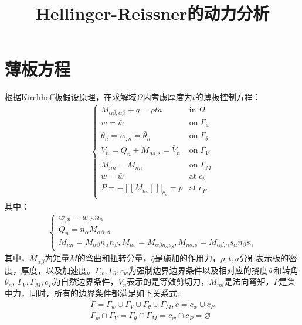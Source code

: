 \documentclass[11pt,a4paper]{article}
\begin{document}
\title{Hellinger-Reissner的动力分析}
\date{}
\maketitle
\section{薄板方程}
根据Kirchhoff板假设原理，在求解域$\Omega$内考虑厚度为$t$的薄板控制方程：
    \begin{equation}
        \begin{split}
        \begin{cases}
        M_{\alpha\beta,\alpha\beta}+\bar q=\rho t a&\text {in} \; \Omega\\
        w=\bar w&\text{on}\;\Gamma_w\\
        \theta_n=w_{,n}=\bar \theta_n&\text{on}\;\Gamma_{\theta}\\
        V_n=Q_n+M_{ns,s}=\bar V_n&\text {on}\;\Gamma_V\\
        M_{nn}=\bar M_{nn}&\text {on}\; \Gamma_M\\
        w=\bar w&\text {at} \; c_w\\
        P=-[[M_{ns}]]\vert_{c_p}=\bar p&\text {at}\; c_P
        \end{cases}
        \end{split}
    \end{equation}
其中：
\begin{equation}
\begin{split}
    \begin{cases}
    w_{,n}=w_{,\alpha}n_{\alpha}\\
Q_n=n_{\alpha}M_{\alpha\beta,\beta}\\
M_{nn}=M_{\alpha\beta}n_{\alpha}n_{\beta},M_{ns}=M_{\alpha\beta n_{\alpha}s_{\beta}},M_{ns,s}=M_{\alpha\beta,\gamma}s_{\alpha}n_{\beta}s_{\gamma}
    \end{cases}
\end{split}
\end{equation}
其中，$M_{\alpha\beta}$为矩量$M$的弯曲和扭转分量，$\bar q$是施加的作用力，$\rho,t,a$分别表示板的密度，厚度，以及加速度。$\Gamma_w,\Gamma_{\theta},c_w$为强制边界边界条件以及相对应的挠度$\bar w$和转角$\bar \theta_n$,
$\Gamma_V,\Gamma_M,c_P$为自然边界条件，$V_n$表示的是等效剪切力，$M_{nn}$是法向弯矩，$P$是集中力，同时，所有的边界条件都满足如下关系式:
\begin{equation}
    \begin{split}
    \Gamma=\Gamma_w\cup\Gamma_V\cup\Gamma_{\theta}\cup\Gamma_M,c=c_w\cup c_P\\
    \Gamma_w\cap\Gamma_V=\Gamma_{\theta}\cap\Gamma_M=c_w\cap c_P=\varnothing
    \end{split}
    \end{equation}
\end{document}
